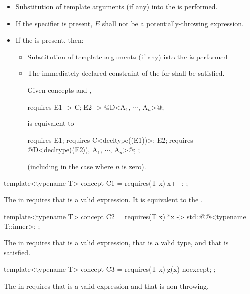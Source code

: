 \begin{itemize}
\item
Substitution of template arguments (if any)
into the  is performed.

\item
If the  specifier is present,
$E$ shall not be a potentially-throwing expression.

\item
If the  is present, then:

\begin{itemize}
\item
Substitution of template arguments (if any)
into the  is performed.

\item
The immediately-declared constraint
of the  for 
shall be satisfied.
\begin{example}
Given concepts  and ,
\begin{codeblock}
requires {
  { E1 } -> C;
  { E2 } -> @D<A$_1$, $\cdots$, A$_n$>@;
};
\end{codeblock}
is equivalent to
\begin{codeblock}
requires {
  E1; requires C<decltype((E1))>;
  E2; requires @D<decltype((E2)), A$_1$, $\cdots$, A$_n$>@;
};
\end{codeblock}
(including in the case where $n$ is zero).
\end{example}
\end{itemize}
\end{itemize}

\pnum
\begin{example}
\begin{codeblock}
template<typename T> concept C1 = requires(T x) {
  {x++};
};
\end{codeblock}
The  in 
requires that  is a valid expression.
It is equivalent to the 
.

\begin{codeblock}
template<typename T> concept C2 = requires(T x) {
  {*x} -> std::@@<typename T::inner>;
};
\end{codeblock}

The  in 
requires that  is a valid expression,
that  is a valid type, and
that  is satisfied.

\begin{codeblock}
template<typename T> concept C3 =
  requires(T x) {
    {g(x)} noexcept;
  };
\end{codeblock}

The  in 
requires that  is a valid expression and
that  is non-throwing.
\end{example}

